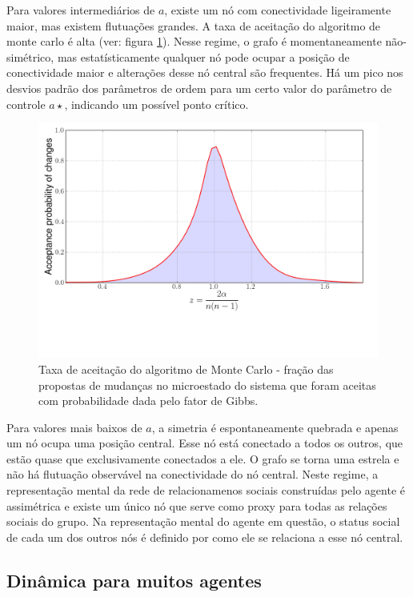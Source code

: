 Para valores intermediários de $a$, existe um nó com conectividade ligeiramente maior, mas existem flutuações grandes. A taxa de aceitação do algoritmo de monte carlo é alta (ver: figura \ref{fig:acceptrate}). Nesse regime, o grafo é momentaneamente não-simétrico, mas estatísticamente qualquer nó pode ocupar a posição de conectividade maior e alterações desse nó central são frequentes. Há um pico nos desvios padrão dos parâmetros de ordem para um certo valor do parâmetro de controle $a{\star}$, indicando um possível ponto crítico. 
\begin{figure}
	\includegraphics[width = \textwidth]{figuras/acceptrate.png}
 	\caption[Taxa de aceitação do algoritmo de Monte Carlo]{Taxa de aceitação do algoritmo de Monte Carlo - fração das propostas de mudanças no microestado do sistema que foram aceitas com probabilidade dada pelo fator de Gibbs.}
 	\label{fig:acceptrate}
\end{figure}

Para valores mais baixos de $a$, a simetria é espontaneamente quebrada e apenas um nó ocupa uma posição central. Esse nó está conectado a todos os outros, que estão quase que exclusivamente conectados a ele. O grafo se torna uma estrela e não há flutuação observável na conectividade do nó central. Neste regime, a representação mental da rede de relacionamenos sociais construídas pelo agente é assimétrica e existe um único nó que serve como proxy para todas as relações sociais do grupo. Na representação mental do agente em questão, o status social de cada um dos outros nós é definido por como ele se relaciona a esse nó central.

\subsection{Dinâmica para muitos agentes } 

